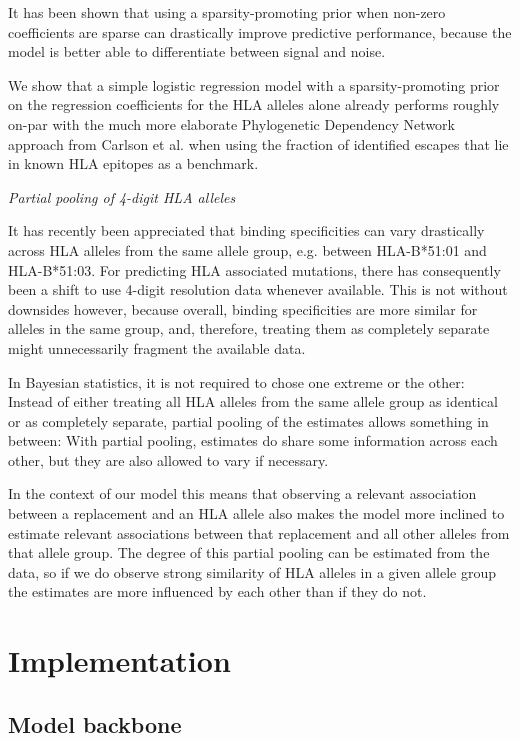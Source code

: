 \documentclass[fleqn,11pt]{SelfArx} %
\begin{document}
  It has been shown that using a sparsity-promoting prior when non-zero coefficients are sparse can drastically improve predictive performance, because the model is better able to differentiate between signal and noise.

  We show that a simple logistic regression model with a sparsity-promoting prior on the regression coefficients for the HLA alleles alone already performs roughly on-par  with the much more elaborate Phylogenetic Dependency Network approach from Carlson et al. when using the fraction of identified escapes that lie in known HLA epitopes as a benchmark.

  \textit{Partial pooling of 4-digit HLA alleles}
  
  It has recently been appreciated that binding specificities can vary drastically across  HLA alleles from the same allele group, e.g. between HLA-B*51:01 and HLA-B*51:03. For predicting HLA associated mutations, there has consequently been a shift to use 4-digit resolution data whenever available. This is not without downsides however, because overall, binding specificities are more similar for alleles in the same group, and, therefore, treating them as completely separate might unnecessarily fragment the available data.

  In Bayesian statistics, it is not required to chose one extreme or the other: Instead of either treating all HLA alleles from the same allele group as identical or as completely separate, partial pooling of the estimates allows something in between: With partial pooling, estimates do share some information across each other, but they are also allowed to vary if necessary.

  In the context of our model this means that observing a relevant association between a replacement and an HLA allele also makes the model more inclined to estimate relevant associations between that replacement and all other alleles from that allele group. The degree of this partial pooling can be estimated from the data, so if we do observe strong similarity of HLA alleles in a given allele group the estimates are more influenced by each other than if they do not.

\section{Implementation}

\subsection*{Model backbone}
\end{document}

